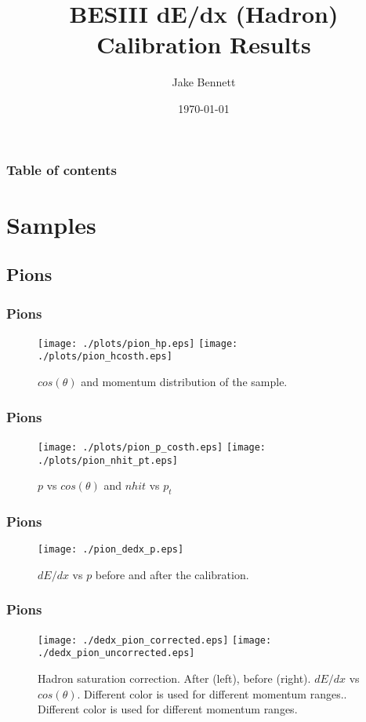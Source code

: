 \documentclass{beamer}
\begin{document}
\title{BESIII dE/dx (Hadron) Calibration Results}  
\author{Jake Bennett}
\date{\today} 

\begin{frame}
\titlepage
\end{frame}

\begin{frame}\frametitle{Table of contents}\tableofcontents
\end{frame} 


\section{Samples} 
\subsection{Pions}
\begin{frame}\frametitle{Pions}
\begin{figure}
\texttt{[image: ./plots/pion\_hp.eps]} 
\texttt{[image: ./plots/pion\_hcosth.eps]} 
\caption{$cos(\theta)$ and momentum distribution of the sample.}
\end{figure}
\end{frame}

\begin{frame}\frametitle{Pions}
\begin{figure}
\texttt{[image: ./plots/pion\_p\_costh.eps]} 
\texttt{[image: ./plots/pion\_nhit\_pt.eps]} 
\caption{$p$ vs $cos(\theta)$ and $nhit$ vs $p_{t}$}
\end{figure}
\end{frame}

\begin{frame}\frametitle{Pions}
\begin{figure}
\texttt{[image: ./pion\_dedx\_p.eps]} 
\caption{$dE/dx$ vs $p$ before and after the calibration.}
\end{figure}
\end{frame}

\begin{frame}\frametitle{Pions}
\begin{figure}
\texttt{[image: ./dedx\_pion\_corrected.eps]} 
\texttt{[image: ./dedx\_pion\_uncorrected.eps]} 
\caption{Hadron saturation correction. After (left), before (right). $dE/dx$ vs $cos(\theta)$. Different color is used for different momentum ranges.. Different color is used for different momentum ranges.}
\end{figure}
\end{frame}
\end{document}
